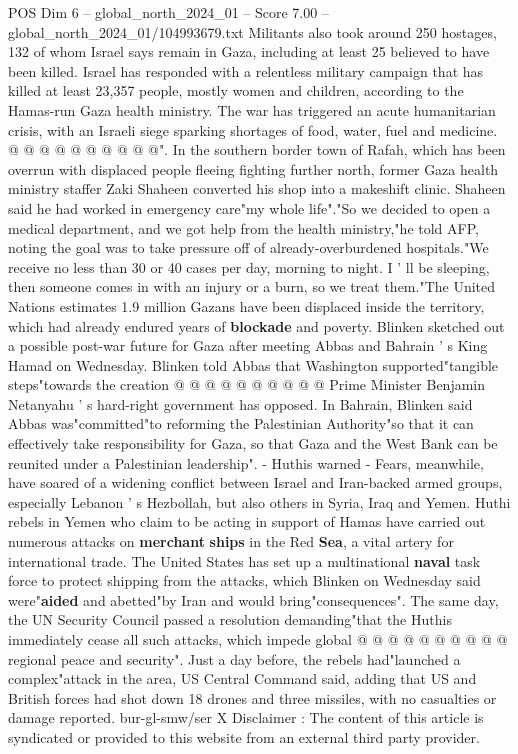 \begin{textsample}{POS Dim 6 – global\_north\_2024\_01 – Score 7.00 – global\_north\_2024\_01/104993679.txt}
Militants also took around 250 hostages, 132 of whom Israel says remain in Gaza, including at least 25 believed to have been killed.
Israel has responded with a relentless military campaign that has killed at least 23,357 people, mostly women and children, according to the Hamas-run Gaza health ministry.
The war has triggered an acute humanitarian crisis, with an Israeli siege sparking shortages of food, water, fuel and medicine. @ @ @ @ @ @ @ @ @ @".
In the southern border town of Rafah, which has been overrun with displaced people fleeing fighting further north, former Gaza health ministry staffer Zaki Shaheen converted his shop into a makeshift clinic.
Shaheen said he had worked in emergency care"my whole life"."So we decided to open a medical department, and we got help from the health ministry,"he told AFP, noting the goal was to take pressure off of already-overburdened hospitals."We receive no less than 30 or 40 cases per day, morning to night.
I ' ll be sleeping, then someone comes in with an injury or a burn, so we treat them."The United Nations estimates 1.9 million Gazans have been displaced inside the territory, which had already endured years of \textbf{blockade} and poverty.
Blinken sketched out a possible post-war future for Gaza after meeting Abbas and Bahrain ' s King Hamad on Wednesday.
Blinken told Abbas that Washington supported"tangible steps"towards the creation @ @ @ @ @ @ @ @ @ @ Prime Minister Benjamin Netanyahu ' s hard-right government has opposed.
In Bahrain, Blinken said Abbas was"committed"to reforming the Palestinian Authority"so that it can effectively take responsibility for Gaza, so that Gaza and the West Bank can be reunited under a Palestinian leadership". - Huthis warned - Fears, meanwhile, have soared of a widening conflict between Israel and Iran-backed armed groups, especially Lebanon ' s Hezbollah, but also others in Syria, Iraq and Yemen.
Huthi rebels in Yemen who claim to be acting in support of Hamas have carried out numerous attacks on \textbf{merchant} \textbf{ships} in the Red \textbf{Sea}, a vital artery for international trade.
The United States has set up a multinational \textbf{naval} task force to protect shipping from the attacks, which Blinken on Wednesday said were"\textbf{aided} and abetted"by Iran and would bring"consequences".
The same day, the UN Security Council passed a resolution demanding"that the Huthis immediately cease all such attacks, which impede global @ @ @ @ @ @ @ @ @ @ regional peace and security".
Just a day before, the rebels had"launched a complex"attack in the area, US Central Command said, adding that US and British forces had shot down 18 drones and three missiles, with no casualties or damage reported. bur-gl-smw/ser X Disclaimer : The content of this article is syndicated or provided to this website from an external third party provider.

\end{textsample}
